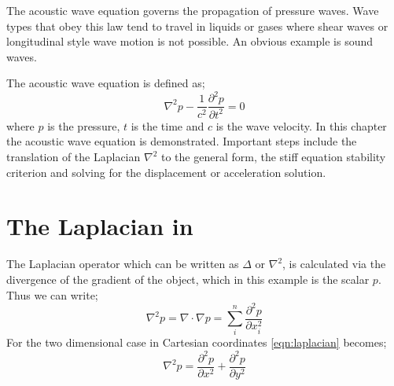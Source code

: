 
%
%
%



The acoustic wave equation governs the propagation of pressure waves. Wave
types that obey this law tend to travel in liquids or gases where shear waves
or longitudinal style wave motion is not possible. An obvious example is sound
waves.

The acoustic wave equation is defined as;
\begin{equation}
 \nabla ^2 p - \frac{1}{c^2} \frac{\partial ^2 p}{\partial t^2} = 0
\label{eqn:acswave}
\end{equation}
where $p$ is the pressure, $t$ is the time and $c$ is the wave velocity. In this
chapter the acoustic wave equation is demonstrated. Important steps include the
translation of the Laplacian $\nabla^2$ to the \esc general form, the stiff
equation stability criterion and solving for the displacement or acceleration solution.

\section{The Laplacian in \esc}
The Laplacian operator which can be written as $\Delta$ or $\nabla^2$,  is
calculated via the divergence of the gradient of the object, which in this
example is the scalar $p$. Thus we can write;
\begin{equation}
 \nabla^2 p = \nabla \cdot \nabla p = 
	\sum_{i}^n
	\frac{\partial^2 p}{\partial x^2_{i}}
 \label{eqn:laplacian}
\end{equation}
For the two dimensional case in Cartesian coordinates \autoref{eqn:laplacian}
becomes;
\begin{equation}
 \nabla^2 p = \frac{\partial^2 p}{\partial x^2} 
		   + \frac{\partial^2 p}{\partial y^2}
\end{equation}

